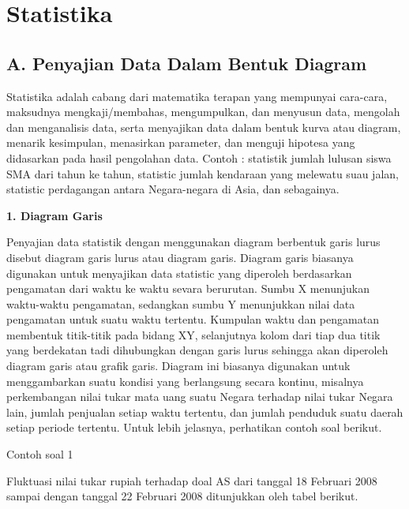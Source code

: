 \documentclass[11pt,fleqn]{book} %
\begin{document}
{%

\chapter{Statistika}

\section{A. Penyajian Data Dalam Bentuk Diagram}

	
	Statistika adalah cabang dari matematika terapan yang mempunyai cara-cara, maksudnya mengkaji/membahas, mengumpulkan, dan menyusun data, mengolah dan menganalisis data, serta menyajikan data dalam bentuk kurva atau diagram, menarik kesimpulan, menasirkan parameter, dan menguji hipotesa yang didasarkan pada hasil pengolahan data. Contoh : statistik jumlah lulusan siswa SMA dari tahun ke tahun, statistic jumlah kendaraan yang melewatu suau jalan, statistic perdagangan antara Negara-negara di Asia, dan sebagainya.

\textbf{1.	Diagram Garis}

Penyajian data statistik dengan menggunakan diagram berbentuk garis lurus disebut diagram garis lurus atau diagram garis. Diagram garis biasanya digunakan untuk menyajikan data statistic yang diperoleh berdasarkan pengamatan dari waktu ke waktu sevara berurutan.
	Sumbu X menunjukan waktu-waktu pengamatan, sedangkan sumbu Y menunjukkan nilai data pengamatan untuk suatu waktu tertentu. Kumpulan waktu dan pengamatan membentuk titik-titik pada bidang XY, selanjutnya kolom dari tiap dua titik yang berdekatan tadi dihubungkan dengan garis lurus sehingga akan diperoleh diagram garis atau grafik garis. Diagram ini biasanya digunakan untuk menggambarkan suatu kondisi yang berlangsung secara kontinu, misalnya perkembangan nilai tukar mata uang suatu Negara terhadap nilai tukar Negara lain, jumlah penjualan setiap waktu tertentu, dan jumlah penduduk suatu daerah setiap periode tertentu. Untuk lebih jelasnya, perhatikan contoh soal berikut.
	
Contoh soal 1

Fluktuasi nilai tukar rupiah terhadap doal AS dari tanggal 18 Februari 2008 sampai dengan tanggal 22 Februari 2008 ditunjukkan oleh tabel berikut.

}
\end{document}
